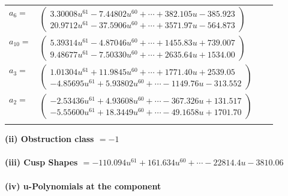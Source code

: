 \documentclass[1p]{elsarticle_modified}
\theoremstyle{definition}
\begin{document}
\begin{tabular}{m{7pt} m{180pt} m{7pt} m{180pt} }
\flushright $a_{6}=$&$\begin{pmatrix}3.30008 u^{61}-7.44802 u^{60}+\cdots+382.105 u-385.923\\20.9712 u^{61}-37.5906 u^{60}+\cdots+3571.97 u-564.873\end{pmatrix}$ \\
\flushright $a_{10}=$&$\begin{pmatrix}5.39314 u^{61}-4.87046 u^{60}+\cdots+1455.83 u+739.007\\9.48677 u^{61}-7.50330 u^{60}+\cdots+2635.64 u+1534.00\end{pmatrix}$ \\
\flushright $a_{3}=$&$\begin{pmatrix}1.01304 u^{61}+11.9845 u^{60}+\cdots+1771.40 u+2539.05\\-4.85695 u^{61}+5.93802 u^{60}+\cdots-1149.76 u-313.552\end{pmatrix}$ \\
\flushright $a_{2}=$&$\begin{pmatrix}-2.53436 u^{61}+4.93608 u^{60}+\cdots-367.326 u+131.517\\-5.55600 u^{61}+18.3449 u^{60}+\cdots-49.1658 u+1701.70\end{pmatrix}$\\&\end{tabular}
\flushleft \textbf{(ii) Obstruction class $= -1$}\\~\\
\flushleft \textbf{(iii) Cusp Shapes $= -110.094 u^{61}+161.634 u^{60}+\cdots-22814.4 u-3810.06$}\\~\\
\newpage\renewcommand{\arraystretch}{1}
\flushleft \textbf{(iv) u-Polynomials at the component}\newline \\
\end{document}
